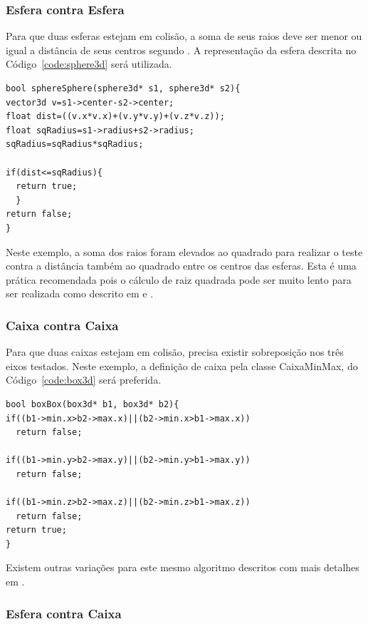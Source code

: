 \subsubsection{Esfera contra Esfera}

Para que duas esferas estejam em colisão, a soma de seus raios deve ser menor
ou igual a distância de seus centros segundo .
A representação da esfera descrita no Código~\ref{code:sphere3d} será utilizada.

\begin{lstlisting}[frame=single,caption=Colisão entre esferas\label{code:collisionSphereSphere}]
bool sphereSphere(sphere3d* s1, sphere3d* s2){
vector3d v=s1->center-s2->center;
float dist=((v.x*v.x)+(v.y*v.y)+(v.z*v.z));
float sqRadius=s1->radius+s2->radius;
sqRadius=sqRadius*sqRadius;

if(dist<=sqRadius){
  return true;
  }
return false;
}
\end{lstlisting}

Neste exemplo, a soma dos raios foram elevados ao quadrado para realizar o
teste contra a distância também ao quadrado entre os centros das esferas.
Esta é uma prática recomendada pois o cálculo de raiz quadrada pode ser muito
lento para ser realizada como descrito em  e .

\subsubsection{Caixa contra Caixa}

Para que duas caixas estejam em colisão, precisa existir sobreposição nos três
eixos testados.
Neste exemplo, a definição de caixa pela classe CaixaMinMax, do Código~\ref{code:box3d} será preferida.

\begin{lstlisting}[frame=single,caption=Colisão entre caixas\label{code:collisionBoxBox}]
bool boxBox(box3d* b1, box3d* b2){
if((b1->min.x>b2->max.x)||(b2->min.x>b1->max.x))
  return false;

if((b1->min.y>b2->max.y)||(b2->min.y>b1->max.y))
  return false;

if((b1->min.z>b2->max.z)||(b2->min.z>b1->max.z))
  return false;
return true;
}
\end{lstlisting}

Existem outras variações para este mesmo algoritmo descritos com mais detalhes
em .

\subsubsection{Esfera contra Caixa}

